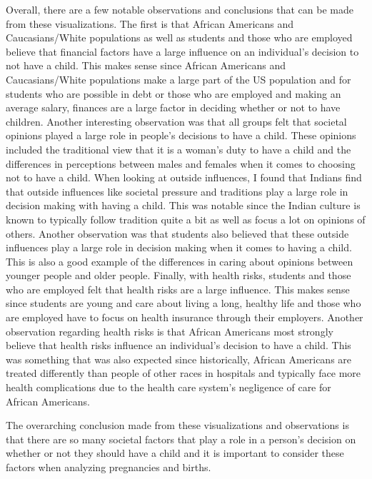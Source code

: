 \documentclass[
]{article}
\begin{document}
Overall, there are a few notable observations and conclusions that can
be made from these visualizations. The first is that African Americans
and Caucasians/White populations as well as students and those who are
employed believe that financial factors have a large influence on an
individual's decision to not have a child. This makes sense since
African Americans and Caucasians/White populations make a large part of
the US population and for students who are possible in debt or those who
are employed and making an average salary, finances are a large factor
in deciding whether or not to have children. Another interesting
observation was that all groups felt that societal opinions played a
large role in people's decisions to have a child. These opinions
included the traditional view that it is a woman's duty to have a child
and the differences in perceptions between males and females when it
comes to choosing not to have a child. When looking at outside
influences, I found that Indians find that outside influences like
societal pressure and traditions play a large role in decision making
with having a child. This was notable since the Indian culture is known
to typically follow tradition quite a bit as well as focus a lot on
opinions of others. Another observation was that students also believed
that these outside influences play a large role in decision making when
it comes to having a child. This is also a good example of the
differences in caring about opinions between younger people and older
people. Finally, with health risks, students and those who are employed
felt that health risks are a large influence. This makes sense since
students are young and care about living a long, healthy life and those
who are employed have to focus on health insurance through their
employers. Another observation regarding health risks is that African
Americans most strongly believe that health risks influence an
individual's decision to have a child. This was something that was also
expected since historically, African Americans are treated differently
than people of other races in hospitals and typically face more health
complications due to the health care system's negligence of care for
African Americans.

The overarching conclusion made from these visualizations and
observations is that there are so many societal factors that play a role
in a person's decision on whether or not they should have a child and it
is important to consider these factors when analyzing pregnancies and
births.
\end{document}
